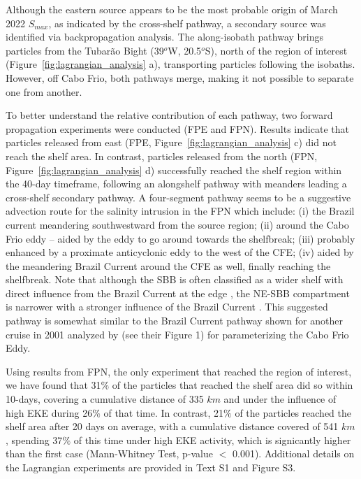 \documentclass[draft]{agujournal2019}
\begin{document}
Although the eastern source appears to be the most probable origin of March 2022 \textit{$S_{max}$}, as indicated by the cross-shelf pathway, a secondary source was identified via backpropagation analysis. The along-isobath pathway brings particles from the Tubarão Bight (39$^o$W, 20.5$^o$S), north of the region of interest (Figure~\ref{fig:lagrangian_analysis} a), transporting particles following the isobaths. However, off Cabo Frio, both pathways merge, making it not possible to separate one from another. 

To better understand the relative contribution of each pathway, two forward propagation experiments were conducted (FPE and FPN). Results indicate that particles released from east (FPE, Figure~\ref{fig:lagrangian_analysis} c) did not reach the shelf area. In contrast, particles released from the north (FPN, Figure~\ref{fig:lagrangian_analysis} d) successfully reached the shelf region within the 40-day timeframe, following an alongshelf pathway with meanders leading a cross-shelf secondary pathway. A four-segment pathway seems to be a suggestive advection route for the salinity intrusion in the FPN which include: (i) the Brazil current meandering southwestward from the source region; (ii) around the Cabo Frio eddy -- aided by the eddy to go around towards the shelfbreak; (iii) probably enhanced by a proximate anticyclonic eddy to the west of the CFE; (iv) aided by the meandering Brazil Current around the CFE as well, finally reaching the shelfbreak. Note that although the SBB is often classified as a wider shelf with direct influence from the Brazil Current at the edge \cite{zembruscki1979geomorfologia}, the NE-SBB compartment is narrower with a stronger influence of the Brazil Current \cite{zembruscki1979geomorfologia,castro1998physical,castro2014summer,dottori2023}. This suggested pathway is somewhat similar to the Brazil Current pathway shown for another cruise in 2001 analyzed by  (see their Figure 1) for parameterizing the Cabo Frio Eddy.

Using results from FPN, the only experiment that reached the region of interest, we have found that 31$\%$ of the particles that reached the shelf area did so within 10-days, covering a cumulative distance of 335 $km$ and under the influence of high EKE during 26$\%$ of that time. In contrast, 21$\%$ of the particles reached the shelf area after 20 days on average, with a cumulative distance covered of 541 $km$, spending 37$\%$ of this time under high EKE activity, which is signicantly higher than the first case (Mann-Whitney Test, p-value $<$ 0.001). Additional details on the Lagrangian experiments are provided in Text S1 and Figure S3.
\end{document}
